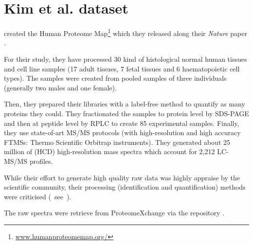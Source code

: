 \section{Kim et al. dataset}
\label{ch:pandeyData}



\cite{PandeyData} created the Human Proteome Map\footnote{%
\href{http://www.humanproteomemap.org/}{\small www.humanproteomemap.org/}} which
they released along their \emph{Nature} paper .

For their study, they have processed 30 kind of histological normal human
tissues and cell line samples (17 adult tissues, 7 fetal tissues and 6
haematopoietic cell types). The samples were created from pooled samples of three
individuals (generally two males and one female).

Then, they prepared their libraries with a label-free method to quantify
as many proteins they could. They fractionated the samples to protein level by
\gls{SDS-PAGE} and then at peptide level by \gls{RPLC} to create 85 experimental
samples. Finally, they use state-of-art \gls{MS/MS} protocols
(with high-resolution and high accuracy \glspl{FTMS}:
Thermo Scientific Orbitrap instruments).
They generated about 25 million of (\gls{HCD})
high-resolution mass spectra which account for 2,212 \gls{LC-MS/MS} profiles.

While their effort to generate high quality raw data was highly appraise
by the scientific community, their processing
(identification and quantification) methods were
criticised (\eg\ see~\cite{Ezkurdia2014-qx}).

The raw spectra were retrieve from ProteomeXchange via the repository
.


\clearpage
